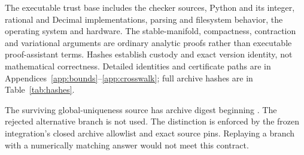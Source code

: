 The executable trust base includes the checker sources, Python and its
integer, rational and Decimal implementations, parsing and filesystem
behavior, the operating system and hardware. The stable-manifold,
compactness, contraction and variational arguments are ordinary analytic
proofs rather than executable proof-assistant terms. Hashes establish
custody and exact version identity, not mathematical correctness.
Detailed identities and certificate paths are in
Appendices~\ref{app:bounds}--\ref{app:crosswalk}; full archive hashes are
in Table~\ref{tab:hashes}.

The surviving global-uniqueness source has archive digest beginning
. The rejected alternative branch is not used.
The distinction is enforced by the frozen integration's closed archive
allowlist and exact source pins. Replaying a branch with a numerically
matching answer would not meet this contract.
